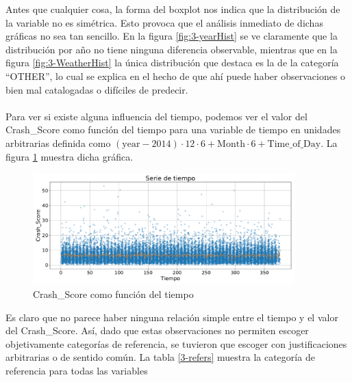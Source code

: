 \documentclass[11pt]{article}
\begin{document}
Antes que cualquier cosa, la forma del boxplot nos indica que la distribución de la variable no es simétrica. Esto provoca que el análisis inmediato de dichas gráficas no sea tan sencillo. En la figura \ref{fig:3-yearHist} se ve claramente que la distribución por año no tiene ninguna diferencia observable, mientras que en la figura \ref{fig:3-WeatherHist} la única distribución que destaca es la de la categoría ``OTHER'', lo cual se explica en el hecho de que ahí puede haber observaciones o bien mal catalogadas o difíciles de predecir.
\\
\\Para ver si existe alguna influencia del tiempo, podemos ver el valor del Crash\_Score como función del tiempo para una variable de tiempo en unidades arbitrarias definida como $(\text{year}-2014) \cdot 12 \cdot 6 + \text{Month} \cdot 6 + \text{Time\_of\_Day}$. La figura \ref{sig} muestra dicha gráfica.
\begin{figure}[H]
    \centering
    \includegraphics[width = 0.9\textwidth]{3-timeplot.pdf}
    \caption{Crash\_Score como función del tiempo}
    \label{sig}
\end{figure}
Es claro que no parece haber ninguna relación simple entre el tiempo y el valor del Crash\_Score. 
Así, dado que estas observaciones no permiten escoger objetivamente categorías de referencia, se tuvieron que escoger con justificaciones arbitrarias  o de sentido común. La tabla \ref{3-refers} muestra la categoría de referencia para todas las variables
\end{document}

